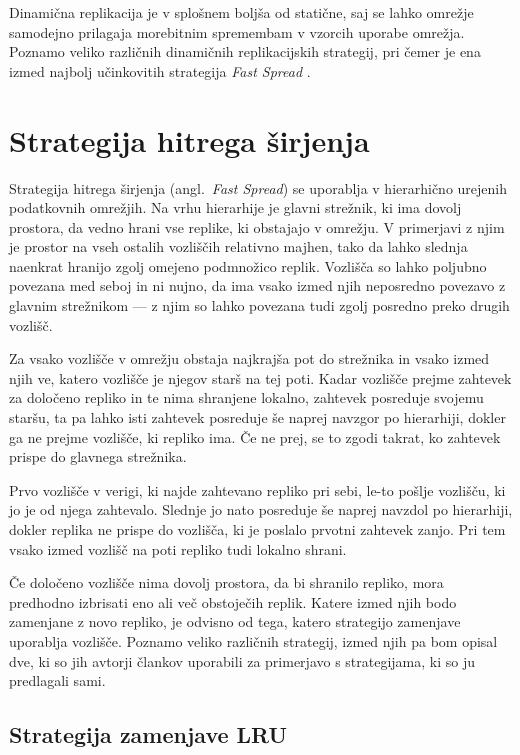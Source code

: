 \documentclass[a4paper, 12pt]{book}
\newcommand{\newterm}{\textit}
\begin{document}
Dinamična replikacija je v splošnem boljša od statične, saj se lahko
omre\-žje samodejno prilagaja morebitnim spremembam v vzorcih uporabe omrežja.
Poznamo veliko različnih dinamičnih replikacijskih
strategij, pri čemer je ena izmed najbolj učinkovitih strategija
\newterm{Fast Spread} \cite{dgrid_goals_perf}.


\section{Strategija hitrega širjenja}
\label{sec:fspread}

Strategija hitrega širjenja (angl.~\textit{Fast Spread}) se uporablja v
hierarhično urejenih podatkovnih omrežjih. Na vrhu hierarhije je glavni
strežnik, ki ima dovolj prostora, da vedno hrani vse replike, ki obstajajo v
omrežju. V primerjavi z njim je prostor na vseh ostalih vozliščih relativno
majhen, tako da lahko slednja naenkrat hranijo zgolj omejeno podmnožico replik.
Vozlišča so lahko poljubno povezana med seboj in ni nujno, da ima vsako izmed
njih neposredno povezavo z glavnim strežnikom --- z njim so lahko povezana tudi
zgolj posredno preko drugih vozlišč.

Za vsako vozlišče v omrežju obstaja najkrajša pot do strežnika in vsako izmed
njih ve, katero vozlišče je njegov starš na tej poti. Kadar vozlišče prejme
zahtevek za določeno repliko in te nima shranjene lokalno, zahtevek
posreduje svojemu staršu, ta pa lahko isti zahtevek posreduje še naprej
navzgor po hierarhiji, dokler ga ne prejme vozlišče, ki repliko ima. Če ne
prej, se to zgodi takrat, ko zahtevek prispe do glavnega strežnika.

Prvo vozlišče v verigi, ki najde zahtevano repliko pri sebi, le-to pošlje
vozlišču, ki jo je od njega zahtevalo. Slednje jo nato posreduje še naprej
navzdol po hierarhiji, dokler replika ne prispe do vozlišča, ki je poslalo
prvotni zahtevek zanjo. Pri tem vsako izmed vozlišč na poti repliko tudi
lokalno shrani.

Če določeno vozlišče nima dovolj prostora, da bi shranilo repliko,
mora predhodno izbrisati eno ali več obstoječih replik. Katere izmed njih bodo
zamenjane z novo repliko, je odvisno od tega, katero strategijo zamenjave
uporablja vozlišče. Poznamo veliko različnih strategij, izmed njih pa bom
opisal dve, ki so jih avtorji člankov uporabili za primerjavo s strategijama,
ki so ju predlagali sami.

\subsection{Strategija zamenjave LRU}
\end{document}
